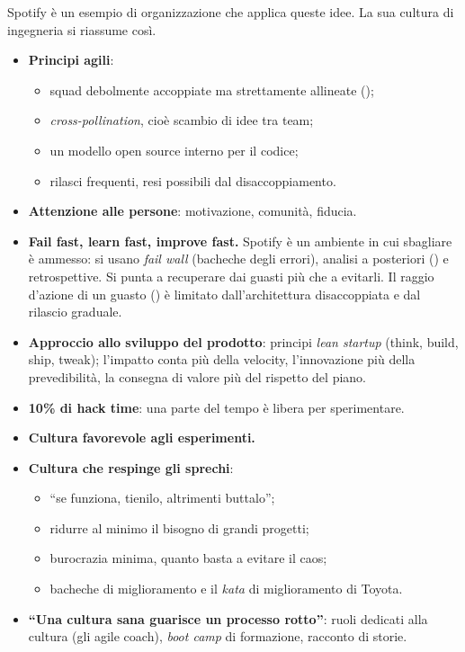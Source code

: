 Spotify è un esempio di organizzazione che applica queste idee. La sua cultura di ingegneria si riassume così.
\begin{itemize}
  \item \textbf{Principi agili}:
    \begin{itemize}
      \item squad debolmente accoppiate ma strettamente allineate ();
      \item \emph{cross-pollination}, cioè scambio di idee tra team;
      \item un modello open source interno per il codice;
      \item rilasci frequenti, resi possibili dal disaccoppiamento.
    \end{itemize}
  \item \textbf{Attenzione alle persone}: motivazione, comunità, fiducia.
  \item \textbf{Fail fast, learn fast, improve fast.} Spotify è un ambiente in cui sbagliare è ammesso: si usano
    \emph{fail wall} (bacheche degli errori), analisi a posteriori () e retrospettive. Si punta a
    recuperare dai guasti più che a evitarli. Il raggio d'azione di un guasto () è limitato
    dall'architettura disaccoppiata e dal rilascio graduale.
  \item \textbf{Approccio allo sviluppo del prodotto}: principi \emph{lean startup} (think, build, ship, tweak);
    l'impatto conta più della velocity, l'innovazione più della prevedibilità, la consegna di valore più del rispetto
    del piano.
  \item \textbf{10\% di hack time}: una parte del tempo è libera per sperimentare.
  \item \textbf{Cultura favorevole agli esperimenti.}
  \item \textbf{Cultura che respinge gli sprechi}:
    \begin{itemize}
      \item ``se funziona, tienilo, altrimenti buttalo'';
      \item ridurre al minimo il bisogno di grandi progetti;
      \item burocrazia minima, quanto basta a evitare il caos;
      \item bacheche di miglioramento e il \emph{kata} di miglioramento di Toyota.
    \end{itemize}
  \item \textbf{``Una cultura sana guarisce un processo rotto''}: ruoli dedicati alla cultura (gli agile coach),
    \emph{boot camp} di formazione, racconto di storie.
\end{itemize}

